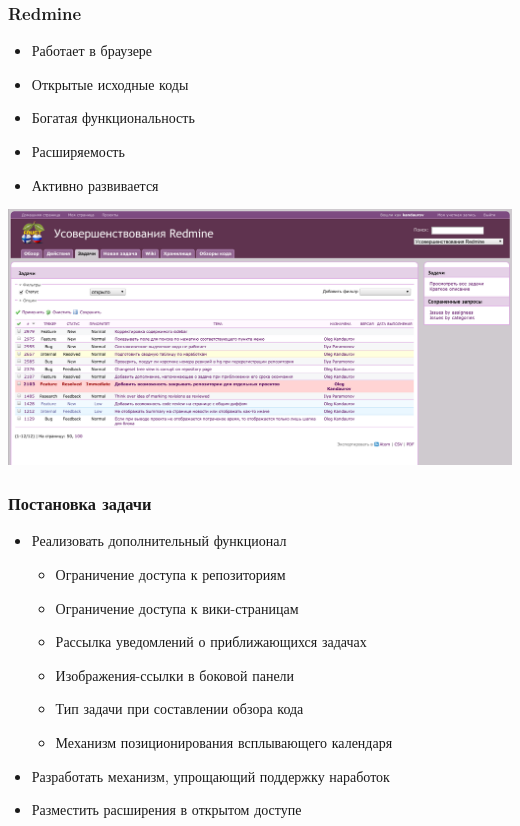 \documentclass[unicode]{beamer}
\begin{document}
\begin{frame}
\transwipe[direction=90]
\frametitle{Redmine}
\begin{block}{}
\small
\begin{itemize}
   \item Работает в браузере
   \item Открытые исходные коды
   \item Богатая функциональность
   \item Расширяемость
   \item Активно развивается
\end{itemize}
\end{block}
\centerline{\includegraphics[width=1\textwidth]{redmine-issues.png}}
\end{frame}

\begin{frame}
\transwipe[direction=90]
\frametitle{Постановка задачи}
\begin{block}{}
\begin{itemize}
  \item Реализовать дополнительный функционал
  \begin{itemize}
    \item Ограничение доступа к репозиториям
    \item Ограничение доступа к вики-страницам
    \item Рассылка уведомлений о приближающихся задачах
    \item Изображения-ссылки в боковой панели
    \item Тип задачи при составлении обзора кода
    \item Механизм позиционирования всплывающего календаря
  \end{itemize}
  \item Разработать механизм, упрощающий поддержку наработок
  \item Разместить расширения в открытом доступе
\end{itemize}
\end{block}
\end{frame}
\end{document}
